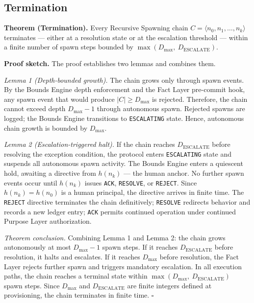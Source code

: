 \subsection{Termination}
\label{sec:rs-termination}

\noindent\textbf{Theorem (Termination).} Every Recursive Spawning chain $C = \langle n_0, n_1, \ldots, n_k \rangle$ terminates — either at a resolution state or at the escalation threshold — within a finite number of spawn steps bounded by $\max(D_{\mathrm{max}},\ D_{\mathrm{ESCALATE}})$.

\medskip
\noindent\textbf{Proof sketch.} The proof establishes two lemmas and combines them.

\medskip
\noindent\textit{Lemma 1 (Depth-bounded growth).} The chain grows only through spawn events. By the Bounds Engine depth enforcement and the Fact Layer pre-commit hook, any spawn event that would produce $|C| \geq D_{\mathrm{max}}$ is rejected. Therefore, the chain cannot exceed depth $D_{\mathrm{max}} - 1$ through autonomous spawn. Rejected spawns are logged; the Bounds Engine transitions to \texttt{ESCALATING} state. Hence, autonomous chain growth is bounded by $D_{\mathrm{max}}$.

\medskip
\noindent\textit{Lemma 2 (Escalation-triggered halt).} If the chain reaches $D_{\mathrm{ESCALATE}}$ before resolving the exception condition, the protocol enters \texttt{ESCALATING} state and suspends all autonomous spawn activity. The Bounds Engine enters a quiescent hold, awaiting a directive from $h(n_k)$ — the human anchor. No further spawn events occur until $h(n_k)$ issues \texttt{ACK}, \texttt{RESOLVE}, or \texttt{REJECT}. Since $h(n_k) = h(n_0)$ is a human principal, the directive arrives in finite time. The \texttt{REJECT} directive terminates the chain definitively; \texttt{RESOLVE} redirects behavior and records a new ledger entry; \texttt{ACK} permits continued operation under continued Purpose Layer authorization.

\medskip
\noindent\textit{Theorem conclusion.} Combining Lemma 1 and Lemma 2: the chain grows autonomously at most $D_{\mathrm{max}} - 1$ spawn steps. If it reaches $D_{\mathrm{ESCALATE}}$ before resolution, it halts and escalates. If it reaches $D_{\mathrm{max}}$ before resolution, the Fact Layer rejects further spawn and triggers mandatory escalation. In all execution paths, the chain reaches a terminal state within $\max(D_{\mathrm{max}},\ D_{\mathrm{ESCALATE}})$ spawn steps. Since $D_{\mathrm{max}}$ and $D_{\mathrm{ESCALATE}}$ are finite integers defined at provisioning, the chain terminates in finite time. $\square$

